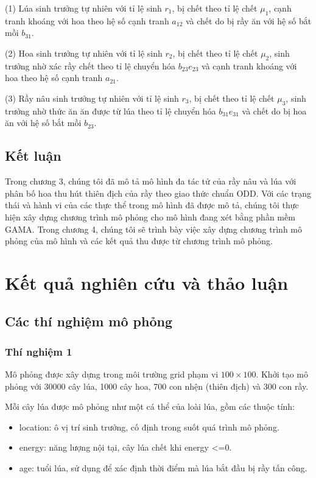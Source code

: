 \documentclass[13pt]{extreport}
\begin{document}
{\indent(1) Lúa sinh trưởng tự nhiên với tỉ lệ sinh $r_1$, bị chết theo tỉ lệ chết $\mu_1$, cạnh tranh khoáng với hoa theo hệ số cạnh tranh $a_{12}$  và chết do bị rầy ăn với hệ số bắt mồi $b_{31}$.

(2) Hoa sinh trưởng tự nhiên với tỉ lệ sinh $r_2$, bị chết theo tỉ lệ chết $\mu_2$, sinh trưởng nhờ xác rầy chết theo tỉ lệ chuyển hóa $b_{23} e_{23}$ và cạnh tranh khoáng với hoa theo hệ số cạnh tranh $a_{21}$.

(3) Rầy nâu sinh trưởng tự nhiên với tỉ lệ sinh $r_3$, bị chết theo tỉ lệ chết $\mu_3$, sinh trưởng nhờ thức ăn ăn được từ lúa theo tỉ lệ chuyển hóa $b_{31} e_{31}$ và chết do bị hoa ăn với hệ số bắt mồi $b_{23}$.

\section*{Kết luận}
Trong chương 3, chúng tôi đã mô tả mô hình đa tác tử của rầy nâu và lúa với phân bố hoa thu hút thiên địch của rầy theo giao thức chuẩn ODD. Với các trạng thái và hành vi của các thực thể trong mô hình đã được mô tả, chúng tôi thực hiện xây dựng chương trình mô phỏng cho mô hình đang xét bằng phần mềm GAMA. Trong chương 4, chúng tôi sẽ trình bày việc xây dựng chương trình mô phỏng của mô hình và các kết quả thu được từ chương trình mô phỏng.

\newpage
\chapter{Kết quả nghiên cứu và thảo luận}
\section{Các thí nghiệm mô phỏng}
\subsection{Thí nghiệm 1}
Mô phỏng được xây dựng trong môi trường grid phạm vi $ 100 \times 100$. Khởi tạo mô phỏng với 30000 cây lúa, 1000 cây hoa, 700 con nhện (thiên địch) và 300 con rầy.

Mỗi cây lúa được mô phỏng như một cá thể của loài lúa, gồm các thuộc tính:
\begin{itemize}
\item location: ô vị trí sinh trưởng, cố định trong suốt quá trình mô phỏng.
\item energy: năng lượng nội tại, cây lúa chết khi energy <=0.
\item age: tuổi lúa, sử dụng để xác định thời điểm mà lúa bắt đầu bị rầy tấn công.
\end{itemize}

}
\end{document}
